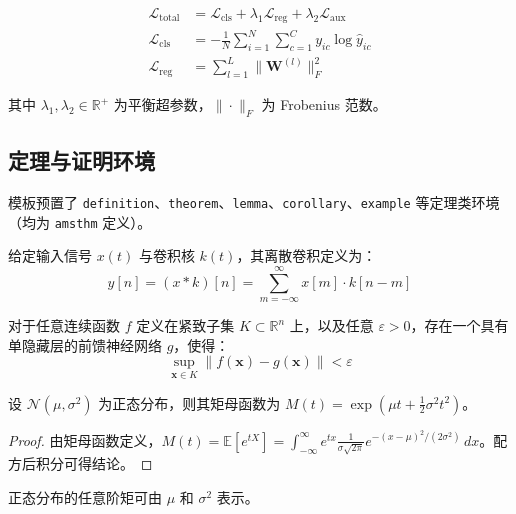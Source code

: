 \documentclass{harryopo-paper}
\begin{document}
\begin{align}
\mathcal{L}_{\text{total}} &= \mathcal{L}_{\text{cls}} + \lambda_{1} \mathcal{L}_{\text{reg}} + \lambda_{2} \mathcal{L}_{\text{aux}} \label{eq:loss}\\
\mathcal{L}_{\text{cls}} &= -\frac{1}{N}\sum_{i=1}^{N} \sum_{c=1}^{C} y_{ic} \log \hat{y}_{ic} \label{eq:ce}\\
\mathcal{L}_{\text{reg}} &= \sum_{l=1}^{L} \|\mathbf{W}^{(l)}\|_{F}^{2} \label{eq:l2}
\end{align}

其中 $\lambda_{1}, \lambda_{2} \in \mathbb{R}^{+}$ 为平衡超参数，$\|\cdot\|_{F}$ 为 Frobenius 范数。

\subsection{定理与证明环境}

模板预置了 \verb|definition|、\verb|theorem|、\verb|lemma|、\verb|corollary|、\verb|example| 等定理类环境（均为 \texttt{amsthm} 定义）。

\begin{definition}[卷积运算]
给定输入信号 $x(t)$ 与卷积核 $k(t)$，其离散卷积定义为：
\begin{equation}
y[n] = (x * k)[n] = \sum_{m=-\infty}^{\infty} x[m] \cdot k[n - m]
\end{equation}
\end{definition}

\begin{theorem}[通用逼近定理]
对于任意连续函数 $f$ 定义在紧致子集 $K \subset \mathbb{R}^{n}$ 上，以及任意 $\varepsilon > 0$，存在一个具有单隐藏层的前馈神经网络 $g$，使得：
\begin{equation}
\sup_{\mathbf{x} \in K} \|f(\mathbf{x}) - g(\mathbf{x})\| < \varepsilon
\end{equation}
\end{theorem}

\begin{lemma}
设 $\mathcal{N}(\mu, \sigma^{2})$ 为正态分布，则其矩母函数为
$M(t) = \exp(\mu t + \frac{1}{2}\sigma^{2}t^{2})$。
\end{lemma}

\begin{proof}
由矩母函数定义，$M(t) = \mathbb{E}[e^{tX}] = \int_{-\infty}^{\infty} e^{tx} \frac{1}{\sigma\sqrt{2\pi}} e^{-(x-\mu)^{2}/(2\sigma^{2})}\,dx$。配方后积分可得结论。
\end{proof}

\begin{corollary}
正态分布的任意阶矩可由 $\mu$ 和 $\sigma^{2}$ 表示。
\end{corollary}
\end{document}
